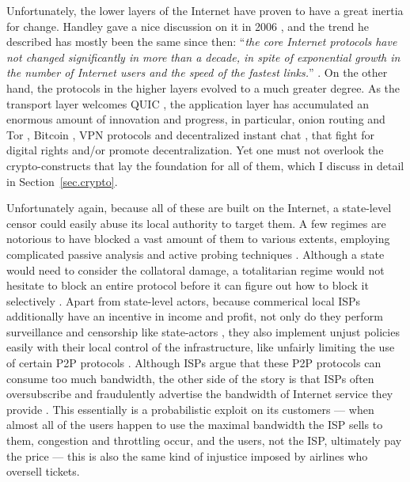 \documentclass[10pt]{article}
\begin{document}
Unfortunately, the lower layers of the Internet have proven to have a great
inertia for change.  Handley gave a nice discussion on it in 2006
\cite{why.internet.just.works}, and the trend he described has mostly been the
same since then: ``\emph{the core Internet protocols have not changed
significantly in more than a decade, in spite of exponential growth in the
number of Internet users and the speed of the fastest links.}''
\cite{why.internet.just.works}. On the other hand, the protocols in the higher
layers evolved to a much greater degree. As the transport layer welcomes
QUIC \cite{quic}, the application layer has accumulated an enormous amount of
innovation and progress, in particular, onion routing and Tor
\cite{onion.routing, tor}, Bitcoin \cite{bitcoin}, VPN protocols \cite{openvpn,
wireguard} and decentralized instant chat \cite{matrix, tox}, that fight for
digital rights and/or promote decentralization. Yet one must not overlook the
crypto-constructs that lay the foundation for all of them, which I discuss in
detail in Section~\ref{sec.crypto}.

Unfortunately again, because all of these are built on the Internet, a
state-level censor could easily abuse its local authority to target them. A few
regimes are notorious to have blocked a vast amount of them to various
extents, employing complicated passive analysis and active probing techniques
\cite{censor.block.1, censor.block.2,censor.block.3, censor.block.4,
censor.block.5,censor.block.6}.
Although a state would need to consider the collatoral damage, a totalitarian
regime would not hesitate to block an entire protocol before it can figure out
how to block it selectively \cite{selective.block.1, censor.block.4}. 
Apart from state-level actors, because commerical local ISPs additionally
have an incentive in income and profit, not only do they perform surveillance
and censorship like state-actors \cite{isp.statelike.actions.1,
isp.statelike.actions.2}, they also implement unjust policies easily with their
local control of the infrastructure, like unfairly limiting the use of certain
P2P protocols \cite{isp.block.p2p.1, isp.block.p2p.2, isp.block.p2p.3,
isp.statelike.actions.1}.  Although ISPs argue that these P2P protocols can
consume too much bandwidth, the other side of the story is that ISPs often
oversubscribe and fraudulently advertise the bandwidth of Internet service they
provide \cite{isp.oversubscribe.1, isp.oversubscribe.2}. This essentially is a
probabilistic exploit on its customers --- when almost all of the users happen
to use the maximal bandwidth the ISP sells to them, congestion and throttling
occur, and the users, not the ISP, ultimately pay the price --- this is also
the same kind of injustice imposed by airlines who oversell tickets.
\end{document}
